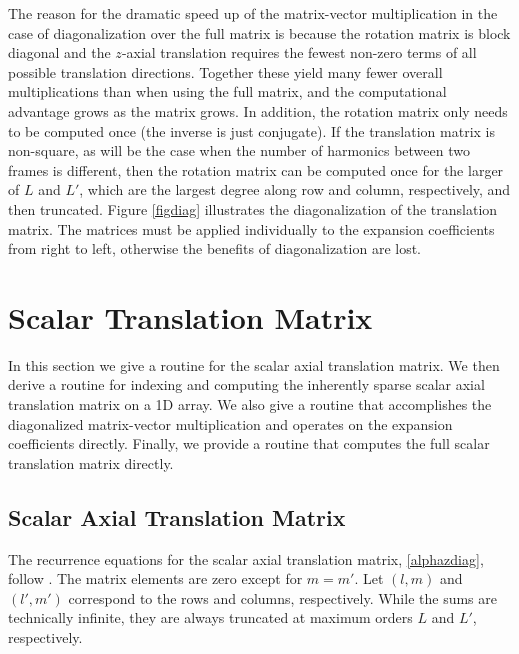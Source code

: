 The reason for the dramatic speed up of the matrix-vector multiplication in the case of diagonalization over the full matrix is because the rotation matrix is block diagonal and the $z$-axial translation requires the fewest non-zero terms of all possible translation directions. Together these yield many fewer overall multiplications than when using the full matrix, and the computational advantage grows as the matrix grows. In addition, the rotation matrix only needs to be computed once (the inverse is just conjugate). If the translation matrix is non-square, as will be the case when the number of harmonics between two frames is different, then the rotation matrix can be computed once for the larger of $L$ and $L'$, which are the largest degree along row and column, respectively, and then truncated.  Figure \ref{figdiag} illustrates the diagonalization of the translation matrix. The matrices must be applied individually to the expansion coefficients from right to left, otherwise the benefits of diagonalization are lost.



\clearpage
\newpage
\section{Scalar Translation Matrix}

In this section we give a routine for the scalar axial translation matrix. We then derive a routine for indexing and computing the inherently sparse scalar axial translation matrix on a 1D array. We also give a routine that accomplishes the diagonalized matrix-vector multiplication and operates on the expansion coefficients directly. Finally, we provide a routine that computes the full scalar translation matrix directly. 

\subsection{Scalar Axial Translation Matrix}

The recurrence equations for the scalar axial translation matrix, \eqref{alphazdiag}, follow \cite{mackowski1991analysis}.  The matrix elements are zero except for $m = m'$.  Let $(l,m)$ and $(l',m')$ correspond to the rows and columns, respectively.  While the sums are technically infinite, they are always truncated at maximum orders $L$ and $L'$, respectively.

